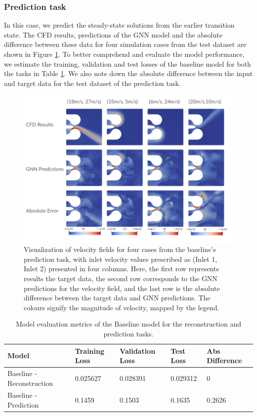\subsubsection{Prediction task}
In this case, we predict the steady-state solutions from the earlier transition state. The CFD results, predictions of the GNN model and the absolute difference between these data for four simulation cases from the test dataset are shown in Figure \ref{blpred}. To better comprehend and evaluate the model performance, we estimate the training, validation and test losses of the baseline model for both the tasks in Table \ref{table:perform}. We also note down the absolute difference between the input and target data for the test dataset of the prediction task.   
\begin{figure}[ht]
    \centering
    \includegraphics[width=14cm]{images/Methodology/Baselineprediction.png}
    \caption{Visualization of velocity fields for four cases from the baseline's prediction task, with inlet velocity values prescribed as (Inlet 1, Inlet 2) presented in four columns. Here, the first row represents results the target data, the second row corresponds to the GNN predictions for the velocity field, and the last row is the absolute difference between the target data and GNN predictions. The colours signify the magnitude of velocity, mapped by the legend.} 
    \label{blpred}
\end{figure}
\begin{table}[ht]
    \centering
    \caption{Model evaluation metrics of the Baseline model for the reconstruction and prediction tasks.} 
    \label{table:perform}
    \begin{tabular}{|l|l|l|l|l|}
    \hline
    \textbf{Model} & \textbf{Training Loss} & \textbf{Validation Loss} & \textbf{Test Loss} & \textbf{Abs Difference} \\
    \hline
    Baseline - Reconstruction & 0.025627 & 0.028391 & 0.029312 & 0\\
    \hline
    Baseline - Prediction & 0.1459 & 0.1503 & 0.1635 & 0.2626\\
    \hline
    \end{tabular}
    \end{table}  

